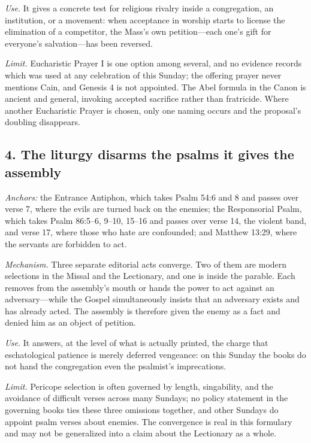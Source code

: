 \emph{Use.} It gives a concrete test for religious rivalry inside a
congregation, an institution, or a movement: when acceptance in worship starts
to license the elimination of a competitor, the Mass's own petition---each
one's gift for everyone's salvation---has been reversed.

\emph{Limit.} Eucharistic Prayer I is one option among several, and no evidence
records which was used at any celebration of this Sunday; the offering prayer
never mentions Cain, and Genesis 4 is not appointed. The Abel formula in the
Canon is ancient and general, invoking accepted sacrifice rather than
fratricide. Where another Eucharistic Prayer is chosen, only one naming occurs
and the proposal's doubling disappears.

\subsection*{4. The liturgy disarms the psalms it gives the assembly}

\emph{Anchors:} the Entrance Antiphon, which takes Psalm 54:6 and 8 and passes
over verse 7, where the evils are turned back on the enemies; the Responsorial
Psalm, which takes Psalm 86:5--6, 9--10, 15--16 and passes over verse 14, the
violent band, and verse 17, where those who hate are confounded; and Matthew
13:29, where the servants are forbidden to act.

\emph{Mechanism.} Three separate editorial acts converge. Two of them are
modern selections in the Missal and the Lectionary, and one is inside the
parable. Each removes from the assembly's mouth or hands the power to act
against an adversary---while the Gospel simultaneously insists that an
adversary exists and has already acted. The assembly is therefore given the
enemy as a fact and denied him as an object of petition.

\emph{Use.} It answers, at the level of what is actually printed, the charge
that eschatological patience is merely deferred vengeance: on this Sunday the
books do not hand the congregation even the psalmist's imprecations.

\emph{Limit.} Pericope selection is often governed by length, singability, and
the avoidance of difficult verses across many Sundays; no policy statement in
the governing books ties these three omissions together, and other Sundays do
appoint psalm verses about enemies. The convergence is real in this formulary
and may not be generalized into a claim about the Lectionary as a whole.

